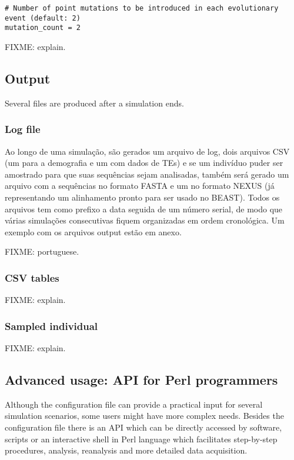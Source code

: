 \documentclass[10pt]{article}
\begin{document}
\begin{verbatim}
# Number of point mutations to be introduced in each evolutionary event (default: 2)
mutation_count = 2
\end{verbatim}

FIXME: explain.

\subsection{Output}
\label{sec:output}

Several files are produced after a simulation ends.

\subsubsection{Log file}
\label{sec:output_log}

Ao longo de uma simulação, são gerados um arquivo de log, dois
arquivos CSV (um para a demografia e um com dados de TEs) e se um
indivíduo puder ser amostrado para que suas sequências sejam
analisadas, também será gerado um arquivo com a sequências no formato
FASTA e um no formato NEXUS (já representando um alinhamento pronto
para ser usado no BEAST). Todos os arquivos tem como prefixo a data
seguida de um número serial, de modo que várias simulações
consecutivas fiquem organizadas em ordem cronológica. Um exemplo com
os arquivos output estão em anexo.

FIXME: portuguese.

\subsubsection{CSV tables}
\label{sec:output_csv}

FIXME: explain.

\subsubsection{Sampled individual}
\label{sec:output_sample}

FIXME: explain.

\subsection{Advanced usage: API for Perl programmers}

Although the configuration file can provide a practical input for
several simulation scenarios, some users might have more complex
needs. Besides the configuration file there is an API which can be
directly accessed by software, scripts or an interactive shell in
Perl language which facilitates step-by-step procedures, analysis,
reanalysis and more detailed data acquisition.
\end{document}
